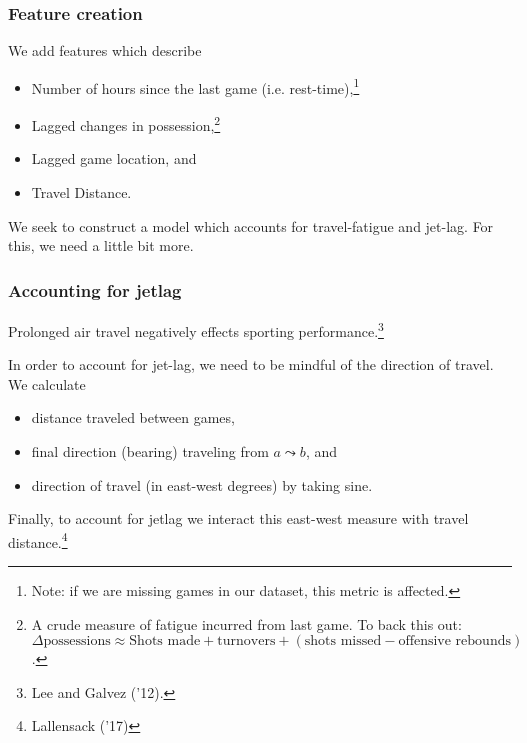 \documentclass{beamer}
\begin{document}
\begin{frame}   \frametitle{Feature creation}
  We add features which describe
  \vspace{12pt}  
  \begin{itemize}     
    \item Number of hours since the last game (i.e. rest-time),\footnote{Note: if we are missing games in our dataset, this metric is affected.}
    \item Lagged changes in possession,\footnote{A crude measure of fatigue incurred from last game. To back this out: $\Delta \textrm{possessions} \approx \textrm{Shots made} + \textrm{turnovers} + (\textrm{shots missed} - \textrm{offensive rebounds})$.
}
    \item Lagged game location, and
    \item Travel Distance.   
  \end{itemize}
  \vspace{12pt}We seek to construct a model which accounts for travel-fatigue and jet-lag.
  For this, we need a little bit more. \end{frame}

\begin{frame}   \frametitle{Accounting for jetlag}
  Prolonged air travel negatively effects sporting performance.\footnote{Lee and Galvez ('12).}

  \vspace{12pt}In order to account for jet-lag, we need to be mindful of the direction of travel. We calculate
  \vspace{12pt}\begin{itemize}     \item distance traveled between games,
    \item final direction (bearing) traveling from $a \leadsto b$, and
    \item direction of travel (in east-west degrees) by taking sine.
  \end{itemize}
  \vspace{12pt}Finally, to account for jetlag we interact this east-west measure with travel distance.\footnote{Lallensack ('17)} \end{frame}
\end{document}
